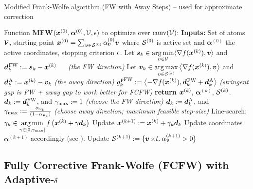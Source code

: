 \begin{algorithm}
	\caption{Modified Frank-Wolfe algorithm (FW with Away Steps) -- used for approximate correction}
	\label{alg:MFW}
	\begin{algorithmic}[1]
	\STATE Function \textbf{MFW}$(\bm{x}^{(0)}, \bm{\alpha}^{(0)}, \mathcal{V}, \epsilon)$ to optimize over $\operatorname*{conv}(\mathcal{V})$: 
	\STATE \textbf{Inputs:} Set of atoms $\mathcal{V}$, starting point $\bm{x}^{(0)}= \sum_{\bm{v} \in \mathcal{S}^{(0)}} \alpha^{(0)}_{\bm{v}} \bm{v}$ where $\mathcal{S}^{(0)}$ is active set and $\bm{\alpha}^{(0)}$ the active coordinates, stopping criterion $\epsilon$.
		\STATE Let $\bm{s}_k \in \displaystyle\operatorname*{\arg\min}_{\bm{v} \in \mathcal{V}} \textstyle\langle\nabla f(\bm{x}^{(k)}),\bm{v}\rangle$ and $\bm{d}_k^{\hspace{0.05em}\textnormal{FW}} := \bm{s}_k - \bm{x}^{(k)}$ \qquad~~ \emph{\small(the FW direction)}
		\STATE Let $\bm{v}_k \in \displaystyle\operatorname*{\arg\max}_{\bm{v} \in \mathcal{S}^{(k)} } \textstyle\left\langle \nabla f(\bm{x}^{(k)}), \bm{v} \right\rangle$ and $\bm{d}_k^{\hspace{0.06em}\textnormal{\scriptsize A}} := \bm{x}^{(k)} - \bm{v}_k$ \qquad \emph{\small(the away direction)}
		\STATE $g_k^{\hspace{0.05em}\textnormal{pFW}}  := \left\langle -\nabla f(\bm{x}^{(k)}), \bm{d}_k^{\hspace{0.05em}\textnormal{FW}} + \bm{d}_k^{\hspace{0.06em}\textnormal{\scriptsize A}}\right\rangle$ \qquad \emph{\small(stringent gap is FW + away gap to work better for FCFW)}
			\STATE \textbf{return} $\bm{x}^{(k)}$, $\bm{\alpha}^{(k)}$, $\mathcal{S}^{(k)}$.
		\ELSE
		 		  \STATE $\bm{d}_k :=  \bm{d}_k^{\hspace{0.05em}\textnormal{FW}}$, and ${\gamma}_{\mathrm{max}} := 1$  
		 			     \hspace{20mm}\emph{\small(choose the FW direction)}
		 		  \ELSE
		 		  \STATE $\bm{d}_k :=  \bm{d}_k^{\hspace{0.06em}\textnormal{\scriptsize A}}$, and ${\gamma}_{\mathrm{max}} := \frac{\alpha_{\bm{v}_k}}{(1- \alpha_{\bm{v}_k})}$
		 		  	\hspace{12mm}\emph{\small(choose away direction; maximum feasible step-size)}
		 		  \ENDIF	
		 		  \STATE Line-search: $\gamma_k \in \displaystyle\operatorname*{\arg\min}_{\gamma \in [0,{\gamma}_{\mathrm{max}}]} \textstyle f\left(\bm{x}^{(k)} + \gamma \bm{d}_k\right)$
			\STATE Update $\bm{x}^{(k+1)} := \bm{x}^{(k)} + \gamma_k \bm{d}_k$
			\STATE Update coordinates $\bm{\alpha}^{(k+1)}$ accordingly (see \citet{lacoste2015MFW}).
			\STATE Update $\mathcal{S}^{(k+1)} := \{\bm{v} \: s.t. \: \alpha^{(k+1)}_{\bm{v}} > 0\}$
		 \ENDIF	
	\ENDFOR
	
	
	\end{algorithmic}
\end{algorithm}


\subsection{Fully Corrective Frank-Wolfe (FCFW) with Adaptive-$\delta$}

